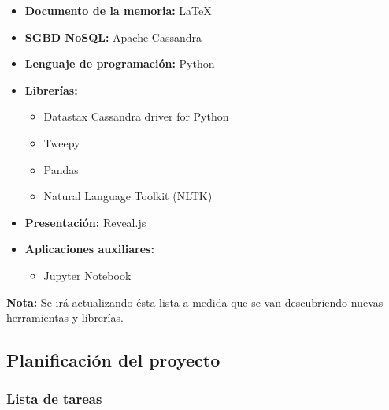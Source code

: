 \begin{itemize}
    \item \textbf{Documento de la memoria: } \LaTeX
    \item \textbf{SGBD NoSQL: } Apache Cassandra
    \item \textbf{Lenguaje de programación: } Python 
    \item \textbf{Librerías: } 
      \begin{itemize}
      \item Datastax Cassandra driver for Python
      \item Tweepy
      \item Pandas
      \item Natural Language Toolkit (NLTK)
      \end{itemize}
    \item \textbf{Presentación: } Reveal.js
    \item \textbf{Aplicaciones auxiliares: } 
      \begin{itemize}
        \item Jupyter Notebook
      \end{itemize}
\end{itemize}

\textbf{Nota:} Se irá actualizando ésta lista a medida que se van descubriendo
nuevas herramientas y librerías.


\subsection{Planificación del proyecto}
\label{subsec:planificació}

\subsubsection{Lista de tareas}
\label{subsubsec:tasklist}

